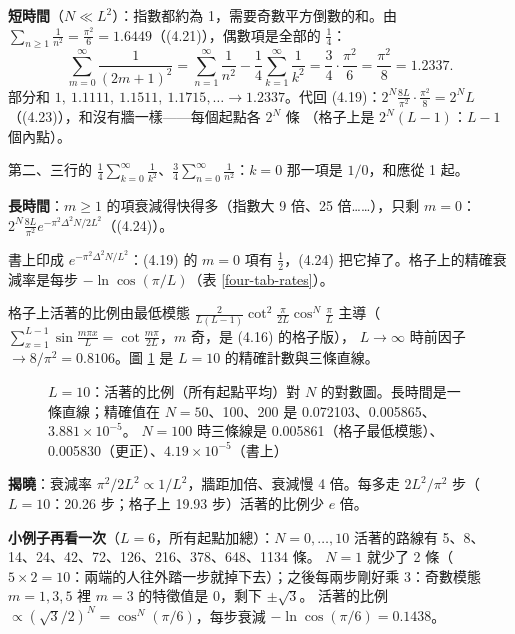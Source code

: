 \textbf{短時間}（$N\ll L^2$）：指數都約為 1，需要奇數平方倒數的和。由 $\sum_{n\ge1}\frac1{n^2}=\frac{\pi^2}{6}=1.6449$（(4.21)），偶數項是全部的 $\frac14$：
\[\sum_{m=0}^\infty\frac1{(2m+1)^2}=\sum_{n=1}^\infty\frac1{n^2}-\frac14\sum_{k=1}^\infty\frac1{k^2}=\frac34\cdot\frac{\pi^2}6=\frac{\pi^2}8=1.2337.\tag{4.22}\]
部分和 $1,\ 1.1111,\ 1.1511,\ 1.1715,\dots\to1.2337$。代回 (4.19)：$2^N\frac{8L}{\pi^2}\cdot\frac{\pi^2}{8}=2^NL$（(4.23)），和沒有牆一樣——每個起點各 $2^N$ 條
（格子上是 $2^N(L-1)$：$L-1$ 個內點）。
\begin{errbox}[p.~77，(4.22)]
第二、三行的 $\frac14\sum_{k=0}^\infty\frac1{k^2}$、$\frac34\sum_{n=0}^\infty\frac1{n^2}$：$k=0$ 那一項是 $1/0$，和應從 1 起。
\end{errbox}

\textbf{長時間}：$m\ge1$ 的項衰減得快得多（指數大 9 倍、25 倍……），只剩 $m=0$：$2^N\frac{8L}{\pi^2}e^{-\pi^2\Delta^2N/2L^2}$（(4.24)）。
\begin{errbox}[p.~77，(4.24)]
書上印成 $e^{-\pi^2\Delta^2N/L^2}$：(4.19) 的 $m=0$ 項有 $\frac12$，(4.24) 把它掉了。格子上的精確衰減率是每步 $-\ln\cos(\pi/L)$（表 \ref{four-tab-rates}）。
\end{errbox}
\begin{table}[H]
\centering
\small
\FourTabRates
\caption{每步的衰減率。牆距加倍，衰減慢 4 倍（格子 4.05 倍）；書上的指數每一格都大了 2 倍}\label{four-tab-rates}
\end{table}
格子上活著的比例由最低模態 $\frac{2}{L(L-1)}\cot^2\frac{\pi}{2L}\cos^N\frac\pi L$ 主導（$\sum_{x=1}^{L-1}\sin\frac{m\pi x}{L}=\cot\frac{m\pi}{2L}$，$m$ 奇，是 (4.16) 的格子版），
$L\to\infty$ 時前因子 $\to8/\pi^2=0.8106$。圖 \ref{four-fig-decay} 是 $L=10$ 的精確計數與三條直線。
\begin{figure}[H]
\centering
\FourFigDecay
\caption{$L=10$：活著的比例（所有起點平均）對 $N$ 的對數圖。長時間是一條直線；精確值在 $N=50$、100、200 是 0.072103、0.005865、$3.881\times10^{-5}$。
$N=100$ 時三條線是 0.005861（格子最低模態）、0.005830（更正）、$4.19\times10^{-5}$（書上）}\label{four-fig-decay}
\end{figure}

\textbf{揭曉}：衰減率 $\pi^2/2L^2\propto1/L^2$，牆距加倍、衰減慢 4 倍。每多走 $2L^2/\pi^2$ 步（$L=10$：20.26 步；格子上 19.93 步）活著的比例少 $e$ 倍。

\textbf{小例子再看一次}（$L=6$，所有起點加總）：$N=0,\dots,10$ 活著的路線有 5、8、14、24、42、72、126、216、378、648、1134 條。
$N=1$ 就少了 2 條（$5\times2=10$：兩端的人往外踏一步就掉下去）；之後每兩步剛好乘 3：奇數模態 $m=1,3,5$ 裡 $m=3$ 的特徵值是 0，剩下 $\pm\sqrt3$。
活著的比例 $\propto(\sqrt3/2)^N=\cos^N(\pi/6)$，每步衰減 $-\ln\cos(\pi/6)=0.1438$。

